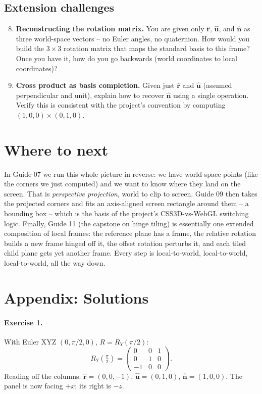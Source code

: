 \documentclass{article}
\begin{document}
\subsection*{Extension challenges}

\begin{enumerate}
    \setcounter{enumi}{7}
    \item \textbf{Reconstructing the rotation matrix.} You are given only
          $\hat{\mathbf{r}}$, $\hat{\mathbf{u}}$, and $\hat{\mathbf{n}}$ as
          three world-space vectors -- no Euler angles, no quaternion. How
          would you build the $3 \times 3$ rotation matrix that maps the
          standard basis to this frame? Once you have it, how do you go
          backwards (world coordinates to local coordinates)?

    \item \textbf{Cross product as basis completion.} Given just
          $\hat{\mathbf{r}}$ and $\hat{\mathbf{u}}$ (assumed perpendicular
          and unit), explain how to recover $\hat{\mathbf{n}}$ using a
          single operation. Verify this is consistent with the project's
          convention by computing $(1,0,0) \times (0,1,0)$.
\end{enumerate}

\section{Where to next}

In Guide 07 we run this whole picture in reverse: we have world-space points
(like the corners we just computed) and we want to know where they land on
the screen. That is \emph{perspective projection}, world to clip to screen.
Guide 09 then takes the projected corners and fits an axis-aligned screen
rectangle around them -- a bounding box -- which is the basis of the
project's CSS3D-vs-WebGL switching logic. Finally, Guide 11 (the capstone on
hinge tiling) is essentially one extended composition of local frames: the
reference plane has a frame, the relative rotation builds a new frame
hinged off it, the offset rotation perturbs it, and each tiled child plane
gets yet another frame. Every step is local-to-world,
local-to-world, local-to-world, all the way down.

\section*{Appendix: Solutions}

\paragraph{Exercise 1.}
With Euler XYZ $(0, \pi/2, 0)$, $R = R_Y(\pi/2)$:
\[
    R_Y(\tfrac{\pi}{2}) =
    \begin{pmatrix} 0 & 0 & 1 \\ 0 & 1 & 0 \\ -1 & 0 & 0 \end{pmatrix}.
\]
Reading off the columns:
$\hat{\mathbf{r}} = (0, 0, -1)$,
$\hat{\mathbf{u}} = (0, 1, 0)$,
$\hat{\mathbf{n}} = (1, 0, 0)$.
The panel is now facing $+x$; its right is $-z$.
\end{document}
